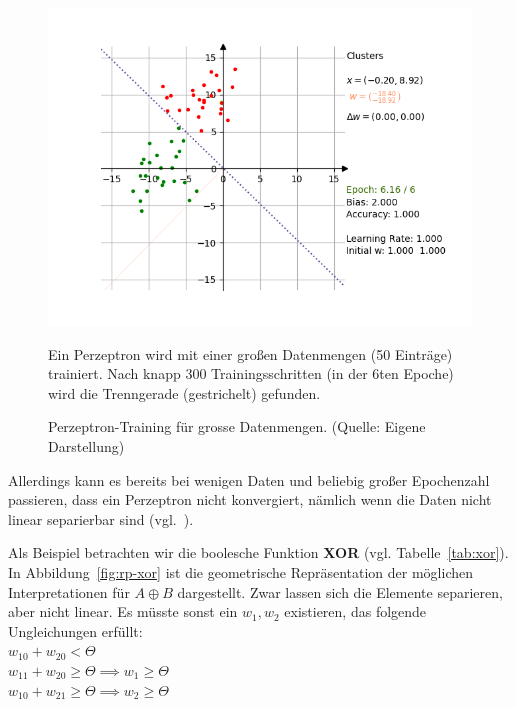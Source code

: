 \begin{figure}[h]
    \begin{center}
    \includegraphics{chapters/3. Kuenstliche Neuronen/images/blob_success}
    \caption{Perzeptron-Training für grosse Datenmengen. (Quelle: Eigene Darstellung)}
    \label{fig:rp-blobs}
    \end{center}
    \small Ein Perzeptron wird mit einer großen Datenmengen (50 Einträge) trainiert. Nach knapp 300 Trainingsschritten (in der 6ten Epoche) wird die Trenngerade (gestrichelt) gefunden.
\end{figure}

\noindent
Allerdings kann es bereits bei wenigen Daten und beliebig großer Epochenzahl passieren, dass ein Perzeptron nicht konvergiert, nämlich wenn die Daten nicht linear separierbar sind (vgl.~\cite[20]{Arb03}).

Als Beispiel betrachten wir die boolesche Funktion \textbf{XOR} (vgl. Tabelle~\ref{tab:xor}).
In Abbildung~\ref{fig:rp-xor} ist die geometrische Repräsentation der möglichen Interpretationen für $A \oplus B$ dargestellt.
Zwar lassen sich die Elemente separieren, aber nicht linear.
Es müsste sonst ein $w_1, w_2$ existieren, das folgende Ungleichungen erfüllt:\\


$w_10 + w_20 < \Theta$\\

$w_11 + w_20 \geq \Theta \implies w_1 \geq \Theta$\\

$w_10 + w_21 \geq \Theta \implies w_2 \geq \Theta$\\


